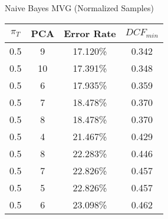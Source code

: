\caption{Naive Bayes MVG (Normalized Samples)}\label{tab:mvgn_naiveacctable}
\begin{center}
\begin{tabular}{|c|c|c|c|}
\hline
$\pi_T$ & PCA & Error Rate & $DCF_{min}$\\
\hline
0.5 & 9 & 17.120\% & 0.342\\
\hline
0.5 & 10 & 17.391\% & 0.348\\
\hline
0.5 & 6 & 17.935\% & 0.359\\
\hline
0.5 & 7 & 18.478\% & 0.370\\
\hline
0.5 & 8 & 18.478\% & 0.370\\
\hline
0.5 & 4 & 21.467\% & 0.429\\
\hline
0.5 & 8 & 22.283\% & 0.446\\
\hline
0.5 & 7 & 22.826\% & 0.457\\
\hline
0.5 & 5 & 22.826\% & 0.457\\
\hline
0.5 & 6 & 23.098\% & 0.462\\
\hline
\end{tabular}
\end{center}
